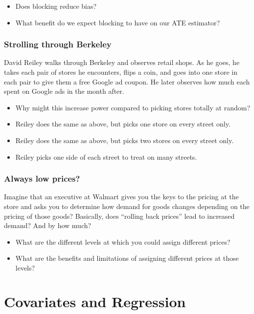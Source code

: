 \documentclass[
]{article}
\providecommand{\tightlist}{%
  \setlength{\itemsep}{0pt}\setlength{\parskip}{0pt}}
\theoremstyle{definition}
\theoremstyle{definition}
\theoremstyle{definition}
\theoremstyle{definition}
\theoremstyle{remark}
\begin{document}
\begin{itemize}
\tightlist
\item
  Does blocking reduce bias?
\item
  What benefit do we expect blocking to have on our ATE estimator?
\end{itemize}

\subsubsection{Strolling through Berkeley}\label{strolling-through-berkeley}

David Reiley walks through Berkeley and observes retail shops. As he goes, he takes each pair of stores he encounters, flips a coin, and goes into one store in each pair to give them a free Google ad coupon. He later observes how much each spent on Google ads in the month after.

\begin{itemize}
\tightlist
\item
  Why might this increase power compared to picking stores totally at random?
\item
  Reiley does the same as above, but picks one store on every street only.
\item
  Reiley does the same as above, but picks two stores on every street only.
\item
  Reiley picks one side of each street to treat on many streets.
\end{itemize}

\subsubsection{Always low prices?}\label{always-low-prices}

Imagine that an executive at Walmart gives you the keys to the pricing at the store and asks you to determine how demand for goods changes depending on the pricing of those goods? Basically, does ``rolling back prices'' lead to increased demand? And by how much?

\begin{itemize}
\tightlist
\item
  What are the different levels at which you could assign different prices?
\item
  What are the benefits and limitations of assigning different prices at those levels?
\end{itemize}

\section{Covariates and Regression}\label{covariates-and-regression}
\end{document}

